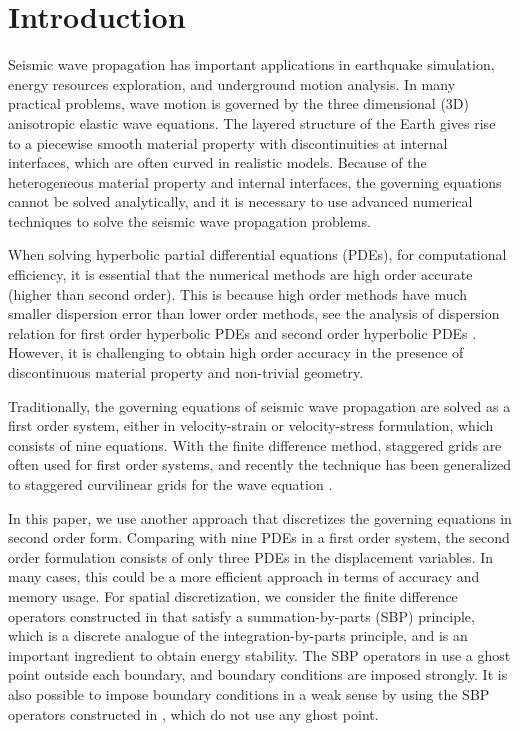 \section{Introduction}
Seismic wave propagation has important applications in earthquake simulation, energy resources exploration, and underground motion analysis. In many practical problems, wave motion is governed by the three dimensional (3D) anisotropic elastic wave equations. The layered structure of the Earth gives rise to a piecewise smooth material property with discontinuities at internal interfaces, which are often curved in realistic models. Because of the heterogeneous material property and internal interfaces, the governing equations cannot be solved analytically, and it is necessary to use advanced numerical techniques to solve the seismic wave propagation problems.

When solving hyperbolic partial differential equations (PDEs), for computational efficiency, it is essential that the numerical methods are high order accurate (higher than second order). This is because high order methods have much smaller dispersion error than lower order methods, see the analysis of dispersion relation for first order hyperbolic PDEs \cite{Kreiss1972} and second order hyperbolic PDEs \cite{Hagstrom2012}. However, it is challenging to obtain high order accuracy in the presence of discontinuous material property and non-trivial geometry. 

Traditionally, the governing equations of seismic wave propagation are solved as a first order system, either in velocity-strain or velocity-stress formulation, which consists of nine equations. With the finite difference method, staggered grids are often used for first order systems, and recently the technique has been generalized to staggered curvilinear grids for the wave equation \cite{OReilly2020}.

In this paper, we use another approach that discretizes the governing equations in second order form. Comparing with nine PDEs in a first order system, the second order formulation consists of only three PDEs in the displacement variables. In many cases, this could be a more efficient approach in terms of accuracy and memory usage. For spatial discretization, we consider the finite difference operators constructed in \cite{sjogreen2012fourth} that satisfy a summation-by-parts (SBP) principle, which is a discrete analogue of the integration-by-parts principle, and is an important ingredient to obtain energy stability. The SBP operators in \cite{sjogreen2012fourth} use a ghost point outside each boundary, and boundary conditions are imposed strongly. It is also possible to impose boundary conditions in a weak sense \cite{Carpenter1994} by using the SBP operators constructed in \cite{Mattsson2012}, which do  not use any ghost point.


